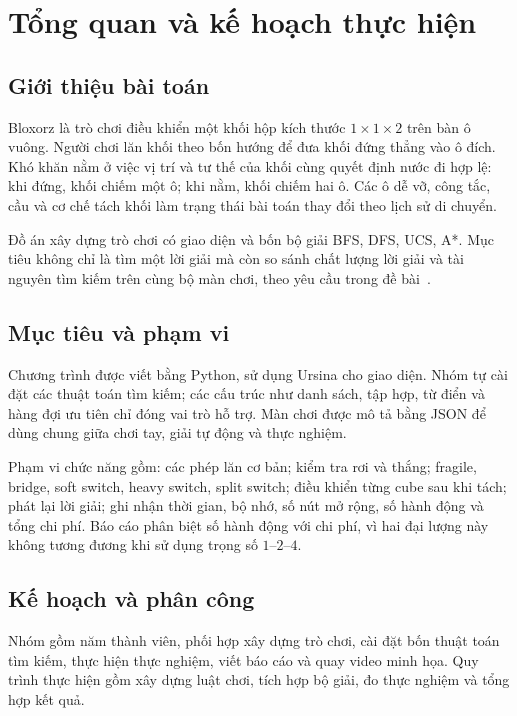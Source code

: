 \section{Tổng quan và kế hoạch thực hiện}
\subsection{Giới thiệu bài toán}
Bloxorz là trò chơi điều khiển một khối hộp kích thước $1\times1\times2$ trên bàn ô vuông. Người chơi lăn khối theo bốn hướng để đưa khối đứng thẳng vào ô đích. Khó khăn nằm ở việc vị trí và tư thế của khối cùng quyết định nước đi hợp lệ: khi đứng, khối chiếm một ô; khi nằm, khối chiếm hai ô. Các ô dễ vỡ, công tắc, cầu và cơ chế tách khối làm trạng thái bài toán thay đổi theo lịch sử di chuyển.

Đồ án xây dựng trò chơi có giao diện và bốn bộ giải BFS, DFS, UCS, A*. Mục tiêu không chỉ là tìm một lời giải mà còn so sánh chất lượng lời giải và tài nguyên tìm kiếm trên cùng bộ màn chơi, theo yêu cầu trong đề bài~\cite{de}.

\subsection{Mục tiêu và phạm vi}
Chương trình được viết bằng Python, sử dụng Ursina cho giao diện. Nhóm tự cài đặt các thuật toán tìm kiếm; các cấu trúc như danh sách, tập hợp, từ điển và hàng đợi ưu tiên chỉ đóng vai trò hỗ trợ. Màn chơi được mô tả bằng JSON để dùng chung giữa chơi tay, giải tự động và thực nghiệm.

Phạm vi chức năng gồm: các phép lăn cơ bản; kiểm tra rơi và thắng; fragile, bridge, soft switch, heavy switch, split switch; điều khiển từng cube sau khi tách; phát lại lời giải; ghi nhận thời gian, bộ nhớ, số nút mở rộng, số hành động và tổng chi phí. Báo cáo phân biệt số hành động với chi phí, vì hai đại lượng này không tương đương khi sử dụng trọng số $1$--$2$--$4$.



\subsection{Kế hoạch và phân công}

Nhóm gồm năm thành viên, phối hợp xây dựng trò chơi,
cài đặt bốn thuật toán tìm kiếm, thực hiện thực nghiệm,
viết báo cáo và quay video minh họa. Quy trình thực hiện gồm xây dựng luật chơi, tích hợp bộ giải, đo thực nghiệm và tổng hợp kết quả.

